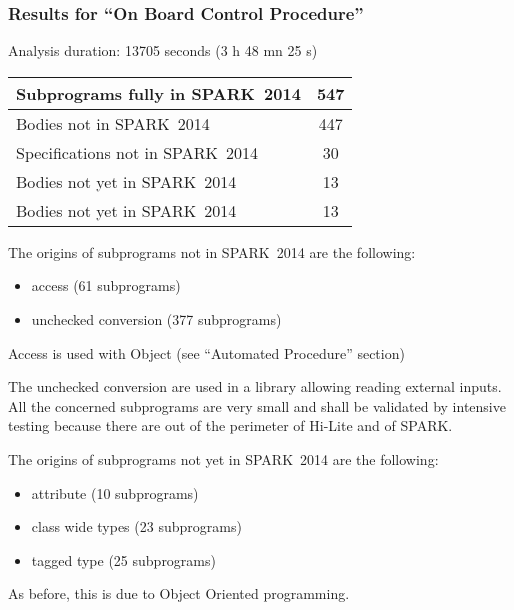 \documentclass[10pt,a4paper,twocolumn]{article}
\newcommand{\newspark}{SPARK~2014\xspace}
\begin{document}
\subsubsection{Results for ``On Board Control Procedure''}

Analysis duration: 13705 seconds (3 h 48 mn 25 s)

\vspace{5mm}

\begin{tabular}{|l|c|}
\hline
Subprograms fully in \newspark  &  547 \\
\hline
Bodies not in \newspark         &  447 \\
\hline
Specifications not in \newspark &   30 \\
\hline
Bodies not yet in \newspark     &   13 \\
\hline
Bodies not yet in \newspark     &   13 \\
\hline
\end{tabular}

\vspace{5mm}

The origins of subprograms not in \newspark are the following:

\begin{itemize}
\item access (61 subprograms)
\item unchecked conversion (377 subprograms)
\end{itemize}

Access is used with Object (see ``Automated Procedure'' section)

The unchecked conversion are used in a library allowing reading external inputs.
All the concerned subprograms are very small and shall be validated by intensive testing because there are out of the perimeter of Hi-Lite and of SPARK.

The origins of subprograms not yet in \newspark are the following:

\begin{itemize}
\item attribute (10 subprograms)
\item class wide types (23 subprograms)
\item tagged type (25 subprograms)
\end{itemize}

As before, this is due to Object Oriented programming.

\vspace{5mm}
\end{document}
